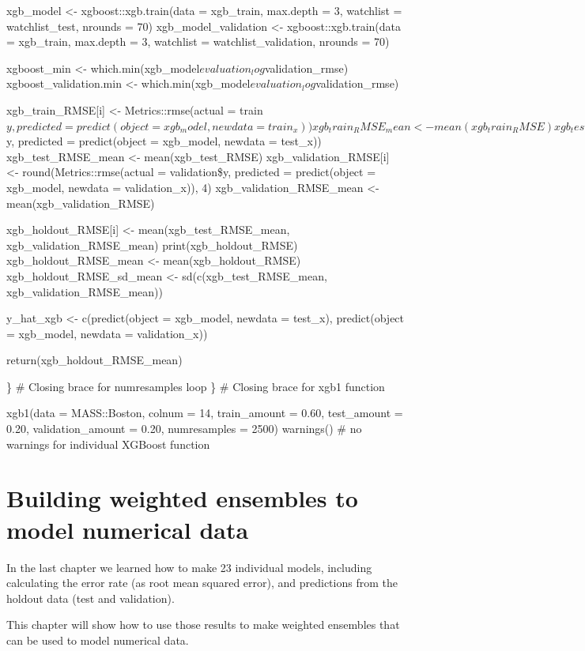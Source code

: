 \documentclass[
]{book}
\begin{document}
xgb\_model \textless- xgboost::xgb.train(data = xgb\_train, max.depth = 3,
watchlist = watchlist\_test, nrounds = 70) xgb\_model\_validation \textless-
xgboost::xgb.train(data = xgb\_train, max.depth = 3, watchlist =
watchlist\_validation, nrounds = 70)

xgboost\_min \textless- which.min(xgb\_model\(evaluation_log\)validation\_rmse)
xgboost\_validation.min \textless-
which.min(xgb\_model\(evaluation_log\)validation\_rmse)

xgb\_train\_RMSE{[}i{]} \textless- Metrics::rmse(actual =
train\(y, predicted = predict(object = xgb_model, newdata = train_x))
xgb_train_RMSE_mean <- mean(xgb_train_RMSE)
xgb_test_RMSE[i] <- Metrics::rmse(actual = test\)y, predicted =
predict(object = xgb\_model, newdata = test\_x)) xgb\_test\_RMSE\_mean \textless-
mean(xgb\_test\_RMSE) xgb\_validation\_RMSE{[}i{]} \textless-
round(Metrics::rmse(actual = validation\$y, predicted = predict(object =
xgb\_model, newdata = validation\_x)), 4) xgb\_validation\_RMSE\_mean \textless-
mean(xgb\_validation\_RMSE)

xgb\_holdout\_RMSE{[}i{]} \textless- mean(xgb\_test\_RMSE\_mean,
xgb\_validation\_RMSE\_mean) print(xgb\_holdout\_RMSE) xgb\_holdout\_RMSE\_mean
\textless- mean(xgb\_holdout\_RMSE) xgb\_holdout\_RMSE\_sd\_mean \textless-
sd(c(xgb\_test\_RMSE\_mean, xgb\_validation\_RMSE\_mean))

y\_hat\_xgb \textless- c(predict(object = xgb\_model, newdata = test\_x),
predict(object = xgb\_model, newdata = validation\_x))

return(xgb\_holdout\_RMSE\_mean)

\} \# Closing brace for numresamples loop \} \# Closing brace for xgb1
function

xgb1(data = MASS::Boston, colnum = 14, train\_amount = 0.60, test\_amount
= 0.20, validation\_amount = 0.20, numresamples = 2500) warnings() \# no
warnings for individual XGBoost function

\chapter{Building weighted ensembles to model numerical data}\label{building-weighted-ensembles-to-model-numerical-data}

In the last chapter we learned how to make 23 individual models,
including calculating the error rate (as root mean squared error), and
predictions from the holdout data (test and validation).

This chapter will show how to use those results to make weighted
ensembles that can be used to model numerical data.
\end{document}
